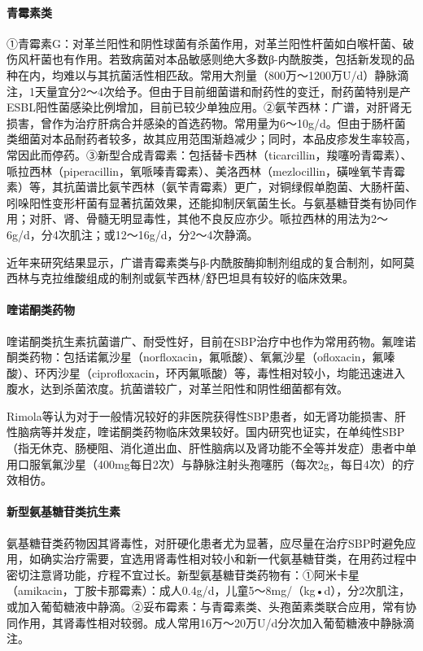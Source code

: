 \paragraph{青霉素类}

①青霉素G：对革兰阳性和阴性球菌有杀菌作用，对革兰阳性杆菌如白喉杆菌、破伤风杆菌也有作用。若致病菌对本品敏感则绝大多数β-内酰胺类，包括新发现的品种在内，均难以与其抗菌活性相匹敌。常用大剂量（800万～1200万U/d）静脉滴注，1天量宜分2～4次给予。但由于目前细菌谱和耐药性的变迁，耐药菌特别是产ESBL阳性菌感染比例增加，目前已较少单独应用。②氨苄西林：广谱，对肝肾无损害，曾作为治疗肝病合并感染的首选药物。常用量为6～10g/d。但由于肠杆菌类细菌对本品耐药者较多，故其应用范围渐趋减少；同时，本品皮疹发生率较高，常因此而停药。③新型合成青霉素：包括替卡西林（ticarcillin，羧噻吩青霉素）、哌拉西林（piperacillin，氧哌嗪青霉素）、美洛西林（mezlocillin，磺唑氧苄青霉素）等，其抗菌谱比氨苄西林（氨苄青霉素）更广，对铜绿假单胞菌、大肠杆菌、吲哚阳性变形杆菌有显著抗菌效果，还能抑制厌氧菌生长。与氨基糖苷类有协同作用；对肝、肾、骨髓无明显毒性，其他不良反应亦少。哌拉西林的用法为2～6g/d，分4次肌注；或12～16g/d，分2～4次静滴。

近年来研究结果显示，广谱青霉素类与β-内酰胺酶抑制剂组成的复合制剂，如阿莫西林与克拉维酸组成的制剂或氨苄西林/舒巴坦具有较好的临床效果。

\paragraph{喹诺酮类药物}

喹诺酮类抗生素抗菌谱广、耐受性好，目前在SBP治疗中也作为常用药物。氟喹诺酮类药物：包括诺氟沙星（norfloxacin，氟哌酸）、氧氟沙星（ofloxacin，氟嗪酸）、环丙沙星（ciprofloxacin，环丙氟哌酸）等，毒性相对较小，均能迅速进入腹水，达到杀菌浓度。抗菌谱较广，对革兰阳性和阴性细菌都有效。

Rimola等认为对于一般情况较好的非医院获得性SBP患者，如无肾功能损害、肝性脑病等并发症，喹诺酮类药物临床效果较好。国内研究也证实，在单纯性SBP（指无休克、肠梗阻、消化道出血、肝性脑病以及肾功能不全等并发症）患者中单用口服氧氟沙星（400mg每日2次）与静脉注射头孢噻肟（每次2g，每日4次）的疗效相仿。

\paragraph{新型氨基糖苷类抗生素}

氨基糖苷类药物因其肾毒性，对肝硬化患者尤为显著，应尽量在治疗SBP时避免应用，如确实治疗需要，宜选用肾毒性相对较小和新一代氨基糖苷类，在用药过程中密切注意肾功能，疗程不宜过长。新型氨基糖苷类药物有：①阿米卡星（amikacin，丁胺卡那霉素）：成人0.4g/d，儿童5～8mg/（kg•d），分2次肌注，或加入葡萄糖液中静滴。②妥布霉素：与青霉素类、头孢菌素类联合应用，常有协同作用，其肾毒性相对较弱。成人常用16万～20万U/d分次加入葡萄糖液中静脉滴注。

